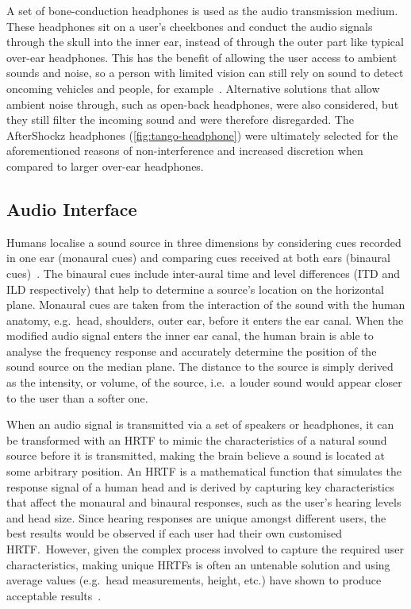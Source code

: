 \documentclass[acmsmall]{acmart}
\begin{document}
A set of bone-conduction headphones is used as the audio transmission medium.
These headphones sit on a user's cheekbones and conduct the audio signals through the skull into the inner ear, instead of through the outer part like typical over-ear headphones. 
This has the benefit of allowing the user access to ambient sounds and noise, so a person with limited vision can still rely on sound to detect oncoming vehicles and people, for example~\citep{lichtenstein2012headphone}.
Alternative solutions that allow ambient noise through, such as open-back headphones, were also considered, but they still filter the incoming sound and were therefore disregarded.
The AfterShockz headphones (\cref{fig:tango-headphone}) were ultimately selected for the aforementioned reasons of non-interference and increased discretion when compared to larger over-ear headphones. 

\subsection{Audio Interface}

Humans localise a sound source in three dimensions by considering cues recorded in one ear (monaural cues) and comparing cues received at both ears (binaural cues)~\citep{blauert1997spatial,blauert1969sound,lock2019bone}.
The binaural cues include inter-aural time and level differences (ITD and ILD respectively) that help to determine a source's location on the horizontal plane.
Monaural cues are taken from the interaction of the sound with the human anatomy, e.g.\ head, shoulders, outer ear, before it enters the ear canal.
When the modified audio signal enters the inner ear canal, the human brain is able to analyse the frequency response and accurately determine the position of the sound source on the median plane. 
The distance to the source is simply derived as the intensity, or volume, of the source, i.e.\ a louder sound would appear closer to the user than a softer one. 

When an audio signal is transmitted via a set of speakers or headphones, it can be transformed with an HRTF to mimic the characteristics of a natural sound source before it is transmitted, making the brain believe a sound is located at some arbitrary position.
An HRTF is a mathematical function that simulates the response signal of a human head and is derived by capturing key characteristics that affect the monaural and binaural responses, such as the user's hearing levels and head size.
Since hearing responses are unique amongst different users, the best results would be observed if each user had their own customised HRTF.\
However, given the complex process involved to capture the required user characteristics, making unique HRTFs is often an untenable solution and using average values (e.g.\ head measurements, height, etc.) have shown to produce acceptable results~\citep{gardner1995hrtf}.
\end{document}
